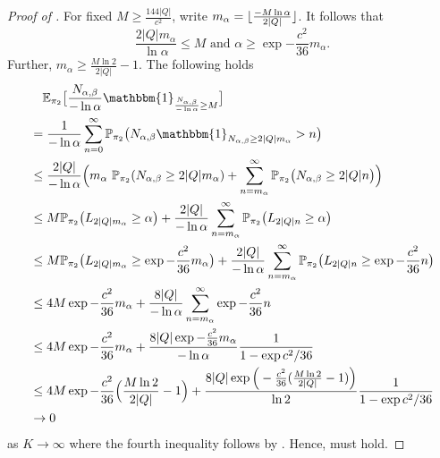 \documentclass[a4paper,UKenglish,cleveref, autoref,mathscr]{lipics-v2019}
\newcommand{\EE}{\mathbb{E}}
\newcommand{\PP}{\mathbb{P}}
\newcommand{\1}{\mathbbm{1}}
\DeclarePairedDelimiter\floor{\lfloor}{\rfloor}
\begin{document}
\begin{proof}[Proof of ]
For fixed $M \geq \frac{144|Q|}{c^2}$, write $m_\alpha = \floor{\frac{- M \ln \alpha}{2|Q|}}$. It follows that 
\begin{equation*}
\frac{2|Q|m_\alpha}{\ln \alpha} \leq M \text{ and } \alpha \geq \exp{-\frac{c^2}{36} m_\alpha}.
\end{equation*}
Further, $m_\alpha \geq \frac{M \ln 2}{2|Q|} - 1$. The following holds
\begin{align*}
& \quad \EE_{\pi_2} \big[ \frac{N_{\alpha, \beta}}{- \ln \alpha} \1_{\frac{N_{\alpha, \beta}}{-\ln \alpha} \geq M}\big]\\
& = \frac{1}{- \ln \alpha} \sum_{n = 0}^\infty \PP_{\pi_2} \big( N_{\alpha, \beta} \1_{N_{\alpha, \beta} \geq 2|Q|m_\alpha}> n\big) \\
& \leq \frac{2|Q|}{- \ln \alpha}\Big( m_\alpha ~\PP_{\pi_2}(N_{\alpha, \beta} \geq 2|Q|m_\alpha) + \sum_{n = m_\alpha}^\infty \PP_{\pi_2}\big( N_{\alpha, \beta} \geq 2|Q|n\big)\Big)\\
& \leq M \PP_{\pi_2}\big( L_{2|Q|m_{\alpha}} \geq \alpha\big) + \frac{2|Q|}{- \ln \alpha} \sum_{n = m_\alpha}^\infty \PP_{\pi_2}\big( L_{2|Q|n} \geq \alpha\big) \\
& \leq M \PP_{\pi_2}\big( L_{2|Q|m_{\alpha}} \geq \exp{-\frac{c^2}{36} m_\alpha}\big) + \frac{2|Q|}{- \ln \alpha} \sum_{n = m_\alpha}^\infty \PP_{\pi_2}\big( L_{2|Q|n} \geq \exp{-\frac{c^2}{36} n}\big) \\
& \leq 4M \exp{-\frac{c^2}{36}m_\alpha}  + \frac{8|Q|}{- \ln \alpha} \sum_{n = m_\alpha}^\infty \exp{-\frac{c^2}{36} n}\\
& \leq 4M \exp{-\frac{c^2}{36}m_\alpha}  + \frac{8|Q|\exp{-\frac{c^2}{36} m_\alpha}}{- \ln \alpha} \frac{1}{1 - \exp{c^2 / 36}}\\
& \leq 4M \exp{-\frac{c^2}{36} \Big(\frac{M \ln 2}{2|Q|} - 1 \Big)}  + \frac{8|Q|\exp \Big( -\frac{c^2}{36} (\frac{M \ln 2}{2|Q|} - 1 ) \Big) }{\ln 2} \frac{1}{1 - \exp{c^2 / 36}}\\
& \rightarrow 0
\end{align*}
as $K \rightarrow \infty$ where the fourth inequality follows by . Hence,  must hold.
\end{proof}

\liexpmotivation*
\end{document}
